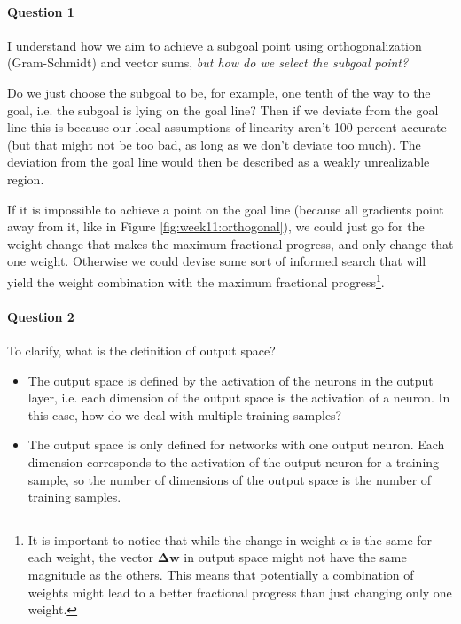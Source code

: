 \documentclass{article}
\renewcommand\vec{\mathbf}
\begin{document}
\paragraph{Question 1}
I understand how we aim to achieve a subgoal point using orthogonalization (Gram-Schmidt) and vector sums, \textit{but how do we select the subgoal point?}

Do we just choose the subgoal to be, for example, one tenth of the way to the goal, i.e. the subgoal is lying on the goal line?
Then if we deviate from the goal line this is because our local assumptions of linearity aren't 100 percent accurate (but that might not be too bad, as long as we don't deviate too much).
The deviation from the goal line would then be described as a weakly unrealizable region.

If it is impossible to achieve a point on the goal line (because all gradients point away from it, like in Figure \ref{fig:week11:orthogonal}), we could just go for the weight change that makes the maximum fractional progress, and only change that one weight. 
Otherwise we could devise some sort of informed search that will yield the weight combination with the maximum fractional progress\footnote{It is important to notice that while the change in weight $\alpha$ is the same for each weight, the vector $\vec{\Delta w}$ in output space might not have the same magnitude as the others. This means that potentially a combination of weights might lead to a better fractional progress than just changing only one weight.}. 

\paragraph{Question 2}
To clarify, what is the definition of output space?
\begin{itemize}
    \item The output space is defined by the activation of the neurons in the output layer, i.e. each dimension of the output space is the activation of a neuron. In this case, how do we deal with multiple training samples?
    \item The output space is only defined for networks with one output neuron. Each dimension corresponds to the activation of the output neuron for a training sample, so the number of dimensions of the output space is the number of training samples.
\end{itemize}






\end{document}
